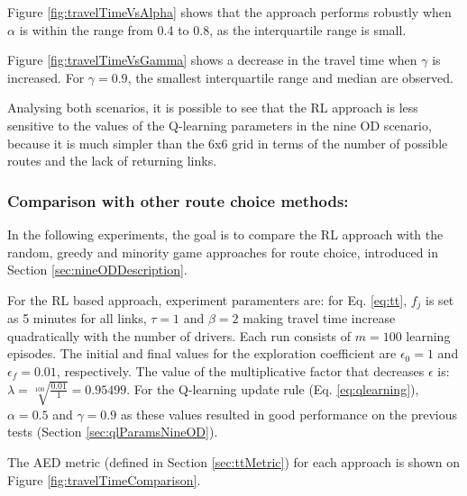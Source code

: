 \documentclass{RITA}
\newcommand{\fftt}{\ensuremath{f_j}} 		%
\begin{document}
Figure \ref{fig:travelTimeVsAlpha} shows that the approach performs robustly when $\alpha$ is within the range from 0.4 to 0.8, as the interquartile range is small.%

Figure \ref{fig:travelTimeVsGamma} shows a decrease in the travel time when $\gamma$ is increased. For $\gamma = 0.9$, the smallest interquartile range and median are observed.

Analysing both scenarios, it is possible to see that the RL approach is less sensitive to the values of the Q-learning parameters in the nine OD scenario, because it is much simpler than the 6x6 grid in terms of the number of possible routes and the lack of returning links. 

\subsubsection{Comparison with other route choice methods:}
In the following experiments, the goal is to compare the RL approach with the random, greedy and minority game approaches for route choice, introduced in Section \ref{sec:nineODDescription}.

For the RL based approach, experiment paramenters are: for Eq. \eqref{eq:tt}, $\fftt$ is set as 5 minutes for all links, $\tau = 1$ and $\beta = 2$ making travel time increase quadratically with the number of drivers. Each run consists of $m = 100$ learning episodes. The initial and final values for the exploration coefficient are $\epsilon_0 = 1$ and $\epsilon_f = 0.01$, respectively. The value of the multiplicative factor that decreases $\epsilon$ is: $\lambda = \sqrt[100]{\frac{0.01}{1}} = 0.95499$. For the Q-learning update rule (Eq. \eqref{eq:qlearning}), $\alpha = 0.5$ and $\gamma = 0.9$ as these values resulted in good performance on the previous tests (Section \ref{sec:qlParamsNineOD}).

The AED metric (defined in Section \ref{sec:ttMetric}) for each approach is shown on Figure \ref{fig:travelTimeComparison}. 
\end{document}
